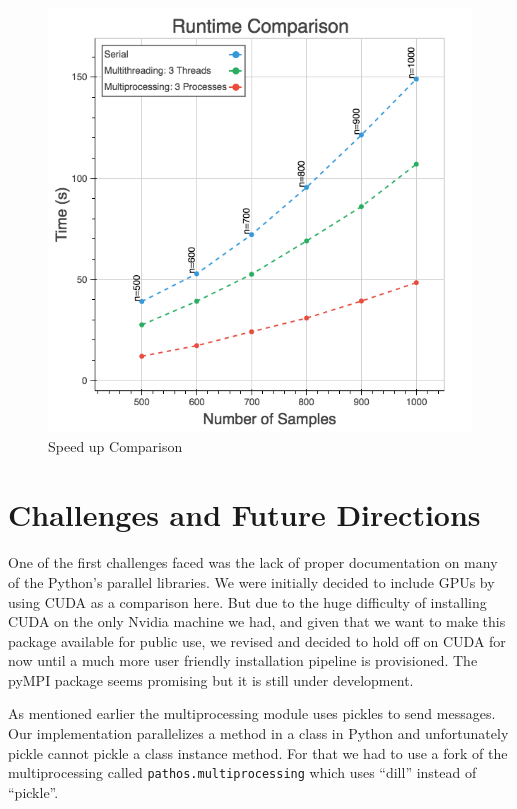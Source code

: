 \documentclass[10pt,twocolumn,letterpaper]{article}
\begin{document}
\begin{figure}[htbp] 
\begin{center}
\includegraphics[scale=0.35]{figure/runtime_comparison.png}
\end{center}
\caption{\label{fig:Speed-up-Comparison}Speed up Comparison}
\end{figure}


\section{Challenges and Future Directions} \label{challenges}

One of the first challenges faced was the lack of proper documentation
on many of the Python's parallel libraries. We were initially decided
to include GPUs by using CUDA as a comparison here. But due to the
huge difficulty of installing CUDA on the only Nvidia machine we had,
and given that we want to make this package available for public use,
we revised and decided to hold off on CUDA for now until a much more
user friendly installation pipeline is provisioned. The pyMPI package
seems promising but it is still under development.

As mentioned earlier the multiprocessing module uses pickles to send
messages. Our implementation parallelizes a method in a class in Python
and unfortunately pickle cannot pickle a class instance method. For
that we had to use a fork of the multiprocessing called \texttt{pathos.multiprocessing}
which uses ``dill'' instead of ``pickle''. 
\end{document}
